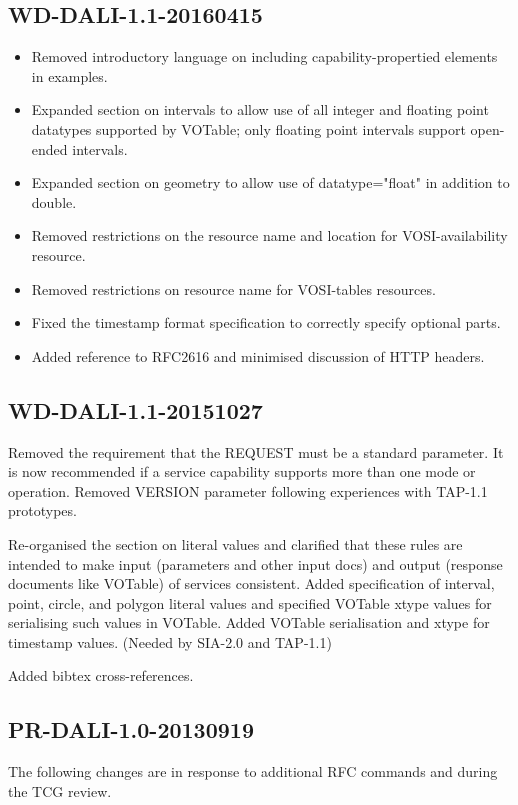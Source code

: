 \documentclass[11pt,letter]{ivoa}
\begin{document}
\subsection{WD-DALI-1.1-20160415}

\begin{itemize}
\item Removed introductory language on including capability-propertied elements in
examples.
\item Expanded section on intervals to allow use of all integer and floating point datatypes 
supported by VOTable; only floating point intervals support open-ended intervals.
\item Expanded section on geometry to allow use of datatype="float" in addition to double.
\item Removed restrictions on the resource name and location for VOSI-availability resource.
\item Removed restrictions on resource name for VOSI-tables resources.
\item Fixed the timestamp format specification to correctly specify optional parts.
\item Added reference to RFC2616 and minimised discussion of HTTP headers.
\end{itemize}

\subsection{WD-DALI-1.1-20151027}

Removed the requirement that the REQUEST must be a standard parameter. It is 
now recommended if a service capability supports more than one mode or 
operation. Removed VERSION parameter following experiences with TAP-1.1 
prototypes.

Re-organised the section on literal values and clarified that these rules 
are intended to make input (parameters and other input docs) and output 
(response documents like VOTable) of services consistent. Added specification 
of interval, point, circle, and polygon literal values and specified VOTable 
xtype values for serialising such values in VOTable. Added VOTable serialisation 
and xtype for timestamp values. (Needed by SIA-2.0 and TAP-1.1)

Added bibtex cross-references.

\subsection{PR-DALI-1.0-20130919}
The following changes are in response to additional RFC commands and during the 
TCG review.
\end{document}
